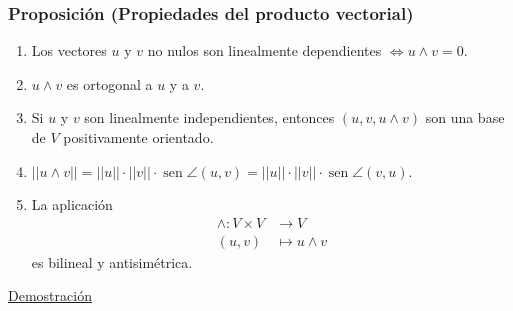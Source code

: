 \documentclass[12pt, a4paper, ones, notitlepage, openany,titlepage]{article}
\begin{document}
\subsubsection{Proposición (Propiedades del producto vectorial)}
\begin{enumerate}
	\item Los vectores $u$ y $v$ no nulos son linealmente dependientes $\Longleftrightarrow u \wedge v = 0$.
	\item $u \wedge v$ es ortogonal a $u$ y a $v$.
	\item Si $u$ y $v$ son linealmente independientes, entonces $(u,v,u \wedge v)$ son una base de $V$ positivamente orientado.
	\item $||u \wedge v || = ||u|| \cdot ||v|| \cdot \operatorname{sen} \angle (u,v) = ||u|| \cdot ||v|| \cdot \operatorname{sen} \angle (v,u)$.
	\item La aplicación
	\begin{align*}
		\wedge : V \times V & \longrightarrow V \\
		(u,v) & \longmapsto u \wedge v
	\end{align*}
	es bilineal y antisimétrica.
\end{enumerate}
\underline{Demostración}\\
\end{document}
